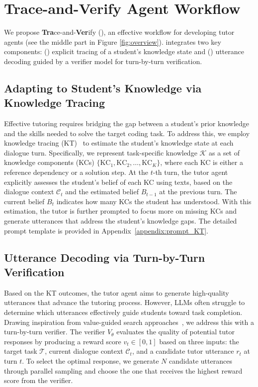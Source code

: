 \section{\textbf{Tra}ce-and-\textbf{Ver}ify Agent Workflow}
\label{sec:methods}

We propose \textbf{Tra}ce-and-\textbf{Ver}ify (\textbf{\model}), an effective workflow for developing tutor agents (see the middle part in Figure \ref{fig:overview}). 
\model integrates two key components: () explicit tracing of a student's knowledge state and () utterance decoding guided by a verifier model for turn-by-turn verification.


\subsection{Adapting to Student's Knowledge via Knowledge Tracing}
Effective tutoring requires bridging the gap between a student's prior knowledge and the skills needed to solve the target coding task. 
To address this, we employ knowledge tracing (KT)~\citep{corbett1994knowledge,abdelrahman2023knowledge,scarlatos2024exploring} to estimate the student's knowledge state at each dialogue turn.
Specifically, we represent task-specific knowledge $\mathcal{K}$ as a set of knowledge components (KCs) $\{\text{KC}_1, \text{KC}_2, \dots, \text{KC}_K\}$, where each KC is either a reference dependency or a solution step. 
At the $t$-th turn, the tutor agent explicitly assesses the student's belief of each KC using texts, based on the dialogue context $\mathcal{C}_t$ and the estimated belief $B_{t-1}$ at the previous turn. 
The current belief $B_{t}$ indicates how many KCs the student has understood. 
With this estimation, the tutor is further prompted to focus more on missing KCs and generate utterances that address the student's knowledge gaps. 
The detailed prompt template is provided in Appendix~\ref{appendix:prompt_KT}.


\subsection{Utterance Decoding via Turn-by-Turn Verification}
Based on the KT outcomes, the tutor agent aims to generate high-quality utterances that advance the tutoring process. 
However, LLMs often struggle to determine which utterances effectively guide students toward task completion. 
Drawing inspiration from value-guided search approaches~\citep{lightman2023let,wang2024math,zhang2024rest}, we address this with a turn-by-turn verifier.
The verifier $V_{\theta}$ evaluates the quality of potential tutor responses by producing a reward score $v_{t}\in[0,1]$ based on three inputs: the target task $\mathcal{T}$, current dialogue context $\mathcal{C}_t$, and a candidate tutor utterance $r_t$ at turn $t$. To select the optimal response, we generate $N$ candidate utterances through parallel sampling and choose the one that receives the highest reward score from the verifier.


